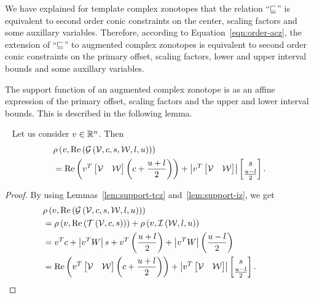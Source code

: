 %
\begin{remark}
We have explained for template complex zonotopes that the relation
``$\sqsubseteq$'' is equivalent to second order conic constraints on the
center, scaling factors and some auxillary variables.  Therefore,
according to Equation~\ref{eqn:order-acz}, the extension of ``$\sqsubseteq$''
to augmented complex zonotopes is equivalent to second order conic
constraints on the primary offset, scaling factors, lower and upper
interval bounds and some auxillary variables.
\end{remark}
%
The support function of an augmented complex zonotope is as an affine
expression of the primary offset, scaling factors and the upper and
lower interval bounds.  This is described in the following lemma.
%
\begin{lemma}~\label{lem:support-acz}
Let us consider
$v\in\mathbb{R}^n$.  Then
%
\begin{align*}
  & \rho\left(v,\operatorname{Re}\left(\mathcal{G}\left(\mathcal{V},c,s,\mathcal{W},l,u\right)\right)\right)\\
  & = \operatorname{Re}\left(v^T\left[\begin{matrix}\mathcal{V} &
    \mathcal{W}\end{matrix}\right]\left(c+\frac{u+l}{2}\right)\right)+\left|v^T\left[\begin{matrix}\mathcal{V} & \mathcal{W}\end{matrix}\right]\right|\left[\begin{matrix}s\\\frac{u-l}{2}\end{matrix}\right].
\end{align*}
%
\end{lemma}
%
\begin{proof}
  By using Lemmas~\ref{lem:support-tcz} and~\ref{lem:support-iz}, we get
  \begin{align*}
    &
    \rho\left(v,\operatorname{Re}\left(\mathcal{G}\left(\mathcal{V},c,s,\mathcal{W},l,u\right)\right)\right)\\
    & = \rho\left(v,\operatorname{Re}\left(\mathit{\operatorname{\mathcal{T}}}\left(\mathcal{V},c,s\right)\right)\right)+\rho\left(v,\mathit{\operatorname{\mathcal{I}}}\left(\mathcal{W},l,u\right)\right)\\
    & = v^Tc+\left|v^TW\right|s+v^T\left(\frac{u+l}{2}\right)+\left|v^TW\right|\left(\frac{u-l}{2}\right)\\
    & =\operatorname{Re}\left(v^T\left[\begin{matrix}\mathcal{V} &
    \mathcal{W}\end{matrix}\right]\left(c+\frac{u+l}{2}\right)\right)+\left|v^T\left[\begin{matrix}\mathcal{V} & \mathcal{W}\end{matrix}\right]\right|\left[\begin{matrix}s\\\frac{u-l}{2}\end{matrix}\right].~\hspace{2em}\qedhere
  \end{align*}
\end{proof}
%


